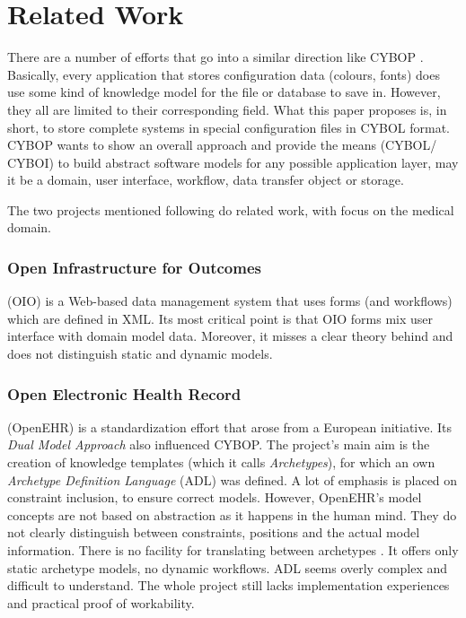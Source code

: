 %
%
%
%
%
%
%

\section{Related Work}
\label{related_work_heading}

There are a number of efforts that go into a similar direction like CYBOP \cite{cybop}.
Basically, every application that stores configuration data (colours, fonts)
does use some kind of knowledge model for the file or database to save in.
However, they all are limited to their corresponding field. What this paper
proposes is, in short, to store complete systems in special configuration files
in CYBOL format. CYBOP wants to show an overall approach and provide the means
(CYBOL/ CYBOI) to build abstract software models for any possible application layer,
may it be a domain, user interface, workflow, data transfer object or storage.

The two projects mentioned following do related work, with focus on the medical
domain.

\subsubsection{Open Infrastructure for Outcomes} (OIO) \cite{oio} is a Web-based
data management system that uses forms (and workflows) which are defined in XML.
Its most critical point is that OIO forms mix user interface with domain model
data. Moreover, it misses a clear theory behind and does not distinguish static
and dynamic models.

\subsubsection{Open Electronic Health Record} (OpenEHR) \cite{openehr} is a
standardization effort that arose from a European initiative. Its \emph{Dual Model
Approach} also influenced CYBOP. The project's main aim is the creation of knowledge
templates (which it calls \emph{Archetypes}), for which an own \emph{Archetype
Definition Language} (ADL) was defined. A lot of emphasis is placed on constraint
inclusion, to ensure correct models. However, OpenEHR's model concepts are not
based on abstraction as it happens in the human mind. They do not clearly
distinguish between constraints, positions and the actual model information.
There is no facility for translating between archetypes \cite{openhealth}.
It offers only static archetype models, no dynamic workflows. ADL seems overly
complex and difficult to understand. The whole project still lacks implementation
experiences and practical proof of workability.
